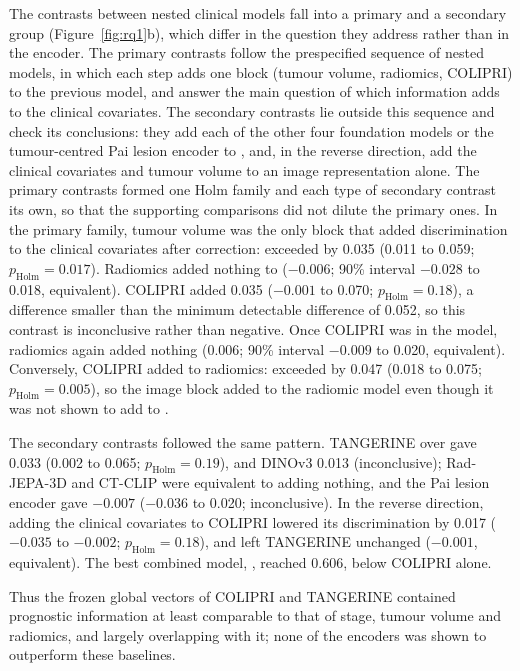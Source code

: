 The contrasts between nested clinical models fall into a primary and a secondary group (Figure~\ref{fig:rq1}b), which differ in the question they address rather than in the encoder. The primary contrasts follow the prespecified sequence of nested models, in which each step adds one block (tumour volume, radiomics, COLIPRI) to the previous model, and answer the main question of which information adds to the clinical covariates. The secondary contrasts lie outside this sequence and check its conclusions: they add each of the other four foundation models or the tumour-centred Pai lesion encoder to , and, in the reverse direction, add the clinical covariates and tumour volume to an image representation alone. The primary contrasts formed one Holm family and each type of secondary contrast its own, so that the supporting comparisons did not dilute the primary ones. In the primary family, tumour volume was the only block that added discrimination to the clinical covariates after correction:  exceeded  by 0.035 (0.011 to 0.059; $p_\mathrm{Holm}=0.017$). Radiomics added nothing to  ($-0.006$; 90\% interval $-0.028$ to 0.018, equivalent). COLIPRI added 0.035 ($-0.001$ to 0.070; $p_\mathrm{Holm}=0.18$), a difference smaller than the minimum detectable difference of 0.052, so this contrast is inconclusive rather than negative. Once COLIPRI was in the model, radiomics again added nothing (0.006; 90\% interval $-0.009$ to 0.020, equivalent). Conversely, COLIPRI added to radiomics:  exceeded  by 0.047 (0.018 to 0.075; $p_\mathrm{Holm}=0.005$), so the image block added to the radiomic model even though it was not shown to add to .

The secondary contrasts followed the same pattern. TANGERINE over  gave 0.033 (0.002 to 0.065; $p_\mathrm{Holm}=0.19$), and DINOv3 0.013 (inconclusive); Rad-JEPA-3D and CT-CLIP were equivalent to adding nothing, and the Pai lesion encoder gave $-0.007$ ($-0.036$ to 0.020; inconclusive). In the reverse direction, adding the clinical covariates to COLIPRI lowered its discrimination by 0.017 ($-0.035$ to $-0.002$; $p_\mathrm{Holm}=0.18$), and left TANGERINE unchanged ($-0.001$, equivalent). The best combined model, , reached 0.606, below COLIPRI alone.

Thus the frozen global vectors of COLIPRI and TANGERINE contained prognostic information at least comparable to that of stage, tumour volume and radiomics, and largely overlapping with it; none of the encoders was shown to outperform these baselines.


